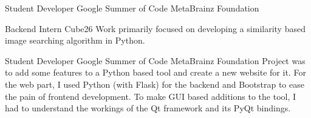     {Student Developer}
    {Google Summer of Code}
    {MetaBrainz Foundation}
    {}
    {}
    \vspace*{0.2\baselineskip}

    {Backend Intern}
    {Cube26}
    {}
    {}
    {
        Work primarily focused on developing a similarity based image searching algorithm in Python.
    }
    \vspace*{0.2\baselineskip}

    {Student Developer}
    {Google Summer of Code}
    {MetaBrainz Foundation}
    {}
    {
        Project was to add some features to a Python based tool and create a new website for it.
        For the web part, I used Python (with Flask) for the backend and Bootstrap to ease the pain of frontend development.
        To make GUI based additions to the tool, I had to understand the workings of the Qt framework and its PyQt bindings.
    }
    \vspace*{0.2\baselineskip}
